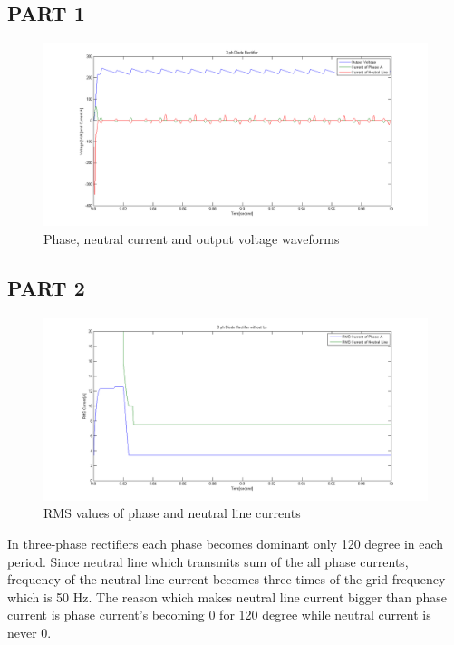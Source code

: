 \documentclass[fleqn, a4paper]{article}
\begin{document}
\subsection{PART 1}
\begin{figure}[H]
  \includegraphics[width=\linewidth]{A3_1.png}
  \caption{Phase, neutral current and output voltage waveforms}
  \label{fig:simulink3}
\end{figure}

\subsection{PART 2}
\begin{figure}[H]
  \includegraphics[width=\linewidth]{A3_3.png}
  \caption{RMS values of phase and neutral line currents}
  \label{fig:simulink3}
\end{figure}
In three-phase rectifiers each phase becomes dominant only 120 degree in each period. Since neutral line which transmits sum of the all phase currents, frequency of the neutral line current becomes three times of the grid frequency which is 50 Hz. The reason which makes neutral line current bigger than phase current is phase current's becoming 0 for 120 degree while neutral current is never 0.
\end{document}
